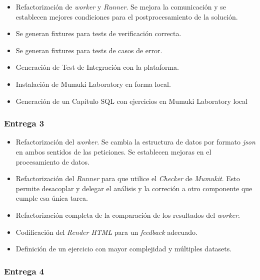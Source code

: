 \begin{itemize}
    \item Refactorización de \textit{worker} y \textit{Runner}.
    Se mejora la comunicación y se establecen mejores condiciones para el
    postprocesamiento de la solución.
    \item Se generan fixtures para tests de verificación correcta.
    \item Se generan fixtures para tests de casos de error.
    \item Generación de Test de Integración con la plataforma.
    \item Instalación de Mumuki Laboratory en forma local.
    \item Generación de un Capítulo SQL con ejercicios en Mumuki Laboratory local
\end{itemize}

\subsubsection{Entrega 3}

\begin{itemize}
    \item Refactorización del \textit{worker}.
    Se cambia la estructura de datos por formato \textit{json} en ambos sentidos
    de las peticiones.
    Se establecen mejoras en el procesamiento de datos.
    \item Refactorización del \textit{Runner} para que utilice el \textit{Checker}
    de \textit{Mumukit}. Esto permite desacoplar y delegar el análisis
    y la correción a otro componente que cumple esa única tarea.
    \item Refactorización completa de la comparación de los resultados del \textit{worker}.
    \item Codificación del \textit{Render HTML} para un \textit{feedback} adecuado.
    \item Definición de un ejercicio con mayor complejidad y múltiples datasets.
\end{itemize}

\subsubsection{Entrega 4}

